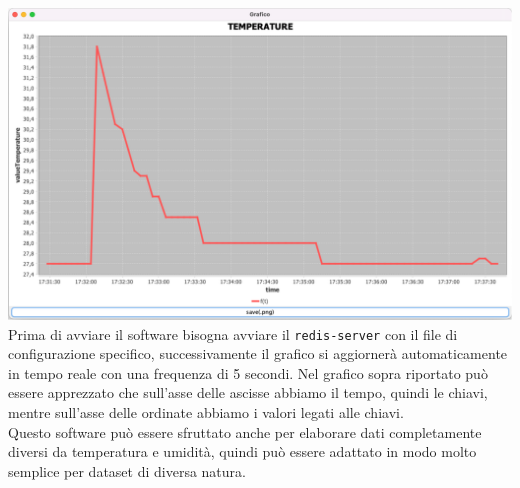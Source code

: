 \includegraphics[width=1\textwidth]{img/chartTemperature}
\\


Prima di avviare il software bisogna avviare il \texttt{redis-server} con il file di configurazione specifico,
successivamente il grafico si aggiornerà automaticamente in tempo reale con una frequenza di 5 secondi.
Nel grafico sopra riportato può essere apprezzato che sull'asse delle ascisse abbiamo il tempo, quindi le chiavi, mentre
sull'asse delle ordinate abbiamo i valori legati alle chiavi.\\
Questo software può essere sfruttato anche per elaborare dati completamente diversi da temperatura e umidità, quindi può essere
adattato in modo molto semplice per dataset di diversa natura.